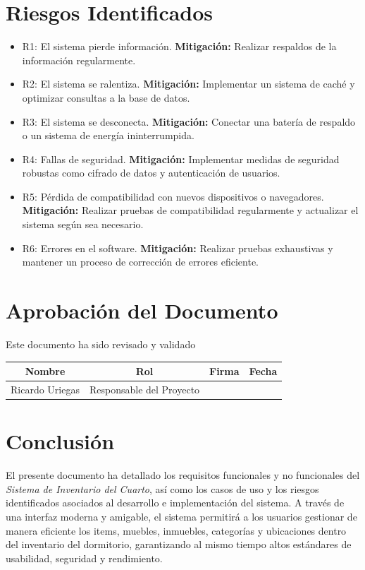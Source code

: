 \documentclass{article}
\begin{document}
\section{Riesgos Identificados}
\begin{itemize}
    \item R1: El sistema pierde información.
        \subitem \textbf{Mitigación:} Realizar respaldos de la información regularmente.
    \item R2: El sistema se ralentiza.
        \subitem \textbf{Mitigación:} Implementar un sistema de caché y optimizar consultas a la base de datos.
    \item R3: El sistema se desconecta.
        \subitem \textbf{Mitigación:} Conectar una batería de respaldo o un sistema de energía ininterrumpida.
    \item R4: Fallas de seguridad.
        \subitem \textbf{Mitigación:} Implementar medidas de seguridad robustas como cifrado de datos y autenticación de usuarios.
    \item R5: Pérdida de compatibilidad con nuevos dispositivos o navegadores.
        \subitem \textbf{Mitigación:} Realizar pruebas de compatibilidad regularmente y actualizar el sistema según sea necesario.
    \item R6: Errores en el software.
        \subitem \textbf{Mitigación:} Realizar pruebas exhaustivas y mantener un proceso de corrección de errores eficiente.
\end{itemize}

\newpage
\section{Aprobación del Documento}
Este documento ha sido revisado y validado
\begin{table}[H]
    \centering
    \begin{tabular}{|c|c|c|c|}
        \hline
        \textbf{Nombre} & \textbf{Rol} & \textbf{Firma} & \textbf{Fecha} \\
        \hline
        Ricardo Uriegas & Responsable del Proyecto & &  \\
        \hline
    \end{tabular}
\end{table}

\newpage
\section{Conclusión}
El presente documento ha detallado los requisitos funcionales y no funcionales del \textit{Sistema de Inventario del Cuarto}, así como los casos de uso y los riesgos identificados asociados al desarrollo e implementación del sistema. A través de una interfaz moderna y amigable, el sistema permitirá a los usuarios gestionar de manera eficiente los items, muebles, inmuebles, categorías y ubicaciones dentro del inventario del dormitorio, garantizando al mismo tiempo altos estándares de usabilidad, seguridad y rendimiento.
\end{document}
